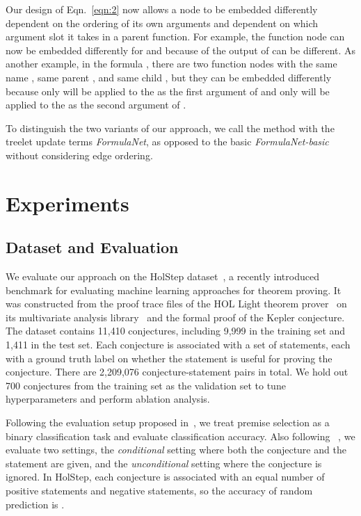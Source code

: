\documentclass{article}
\begin{document}
Our design of Eqn.~\ref{eqn:2} now allows a node to be embedded differently dependent on
the ordering of its own arguments and dependent on which argument slot it takes in a parent
function. For example, the function node  can now be embedded differently for 
and  because of the output of  can be different. As another example, in the formula
, there are two function nodes with the same name , same parent , and
same child , but they can be embedded differently because only  will be applied to the  as the first
argument of  and only  will be applied to the  as the second argument of
. 

To distinguish the two variants of our approach, we call the method with the treelet
update terms \emph{FormulaNet}, as opposed to the basic \emph{FormulaNet-basic}
without considering edge ordering. 

\section{Experiments}

\subsection{Dataset and Evaluation} 
We evaluate our approach on the HolStep dataset~\cite{holstep}, a recently introduced
benchmark for evaluating machine learning approaches for theorem proving. It was
constructed from the proof trace files of the HOL Light theorem prover~\cite{Harrison2009} on its
multivariate analysis library~\cite{harrison2013hol} and the formal proof of the Kepler conjecture. 
The dataset contains 11,410 conjectures, including 9,999 in the training set and 1,411 in
the test set. Each conjecture is associated with a set of statements, each with a ground
truth label on whether the statement is useful for proving the conjecture. There are 2,209,076
conjecture-statement pairs in total. We hold out 700 conjectures from the training set as the validation set to
tune hyperparameters and perform ablation analysis. 

Following the evaluation setup proposed in~\cite{holstep}, we treat premise selection as
a binary classification task and evaluate classification accuracy. Also following ~\cite{holstep},
we evaluate two settings, the \emph{conditional} setting where both the conjecture and the statement are given, and
the \emph{unconditional} setting where the conjecture is ignored. In HolStep, each
conjecture is associated with an equal number of positive statements and 
 negative statements, so the accuracy of random prediction is . 
\end{document}
